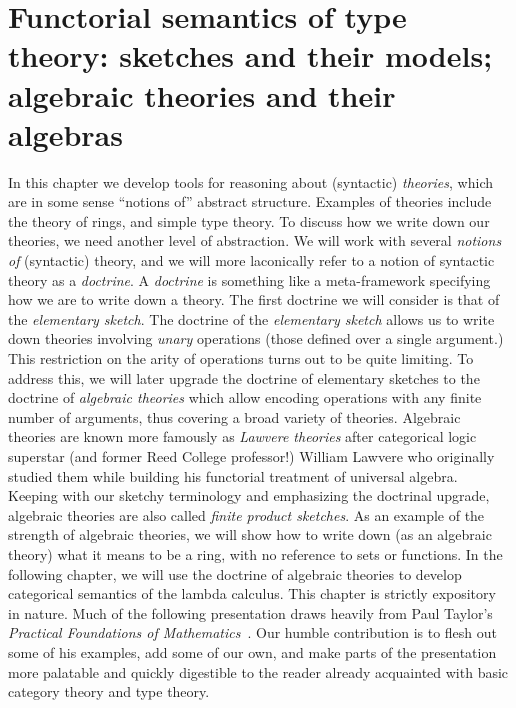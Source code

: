 \documentclass[12pt,twoside]{reedthesis}
\theoremstyle{definition}
\theoremstyle{remark}
\theoremstyle{plain}
\begin{document}
\chapter{Functorial semantics of type theory: sketches and their models; algebraic theories and their algebras}
In this chapter we develop tools for reasoning about (syntactic)
\emph{theories}, which are in some sense ``notions of'' abstract structure.
Examples of theories include the theory of rings, and simple type theory. To
discuss how we write down our theories, we need another level of abstraction. We
will work with several \emph{notions of} (syntactic) theory, and we will more
laconically refer to a notion of syntactic theory as a \emph{doctrine}. A
\emph{doctrine} is something like a meta-framework specifying how we are to
write down a theory. The first doctrine we will consider is that of the
\emph{elementary sketch}. %
The doctrine of the \emph{elementary sketch} allows us to write down theories
involving \emph{unary} operations (those defined over a single argument.) This
restriction on the arity of operations turns out to be quite limiting. To
address this, we will later upgrade the doctrine of elementary sketches to the
doctrine of \emph{algebraic theories} which allow encoding operations with any
finite number of arguments, thus covering a broad variety of theories. Algebraic
theories are known more famously as \emph{Lawvere theories} after categorical
logic superstar (and former Reed College professor!) William Lawvere who
originally studied them while building his functorial treatment of universal
algebra. Keeping with our sketchy terminology and emphasizing the doctrinal
upgrade, algebraic theories are also called \emph{finite product sketches}. As
an example of the strength of algebraic theories, we will show how to write down
(as an algebraic theory) what it means to be a ring, with no reference to sets
or functions. In the following chapter, we will use the doctrine of algebraic
theories to develop categorical semantics of the lambda calculus. This chapter
is strictly expository in nature. Much of the following presentation draws
heavily from Paul Taylor's \emph{Practical Foundations of Mathematics}~\cite{taylor_practical_1999}. Our humble contribution is to flesh out some of
his examples, add some of our own, and make parts of the presentation more
palatable and quickly digestible to the reader already acquainted with basic
category theory and type theory.
\end{document}
